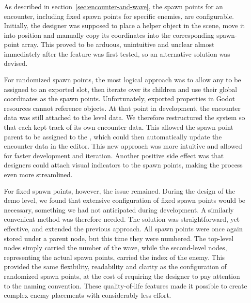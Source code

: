 \documentclass[../Main.tex]{subfiles}
\begin{document}
\subsubsection{}\label{sec:encountertrigger}

As described in section~\ref{sec:encounter-and-wave}, the spawn points for an encounter, including fixed spawn points for specific enemies, are configurable. Initially, the designer was supposed to place a helper object in the scene, move it into position and manually copy its coordinates into the corresponding spawn-point array. This proved to be arduous, unintuitive and unclear almost immediately after the feature was first tested, so an alternative solution was devised.

For randomized spawn points, the most logical approach was to allow any  to be assigned to an exported slot, then iterate over its children and use their global coordinates as the spawn points. Unfortunately, exported properties in Godot resources cannot reference  objects. At that point in development, the encounter data was still attached to the level data. We therefore restructured the system so that each  kept track of its own encounter data. This allowed the spawn-point parent to be assigned to the , which could then automatically update the encounter data in the editor. This new approach was more intuitive and allowed for faster development and iteration. Another positive side effect was that designers could attach visual indicators to the spawn points, making the process even more streamlined.

For fixed spawn points, however, the issue remained. During the design of the demo level, we found that extensive configuration of fixed spawn points would be necessary, something we had not anticipated during development. A similarly convenient method was therefore needed. The solution was straightforward, yet effective, and extended the previous approach. All spawn points were once again stored under a parent node, but this time they were numbered. The top-level nodes simply carried the number of the wave, while the second-level nodes, representing the actual spawn points, carried the index of the enemy. This provided the same flexibility, readability and clarity as the configuration of randomized spawn points, at the cost of requiring the designer to pay attention to the naming convention. These quality-of-life features made it possible to create complex enemy placements with considerably less effort.
\end{document}
